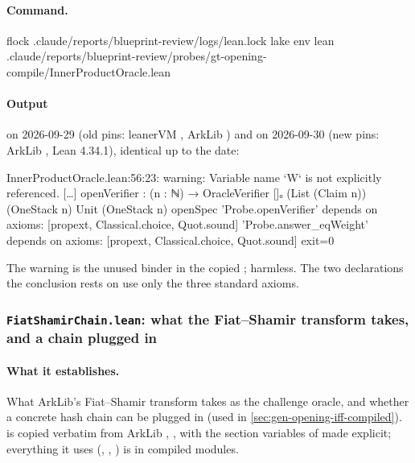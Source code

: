 \paragraph{Command.}
\begin{shellcode}
flock .claude/reports/blueprint-review/logs/lean.lock lake env lean .claude/reports/blueprint-review/probes/gt-opening-compile/InnerProductOracle.lean
\end{shellcode}

\paragraph{Output} on 2026-09-29 (old pins: leanerVM , ArkLib ) and on
2026-09-30 (new pins: ArkLib , Lean 4.34.1), identical up to the date:
\begin{shellcode}
InnerProductOracle.lean:56:23: warning: Variable name `W` is not explicitly referenced. […]
openVerifier : (n : ℕ) → OracleVerifier []ₒ (List (Claim n)) (OneStack n) Unit (OneStack n) openSpec
'Probe.openVerifier' depends on axioms: [propext, Classical.choice, Quot.sound]
'Probe.answer_eqWeight' depends on axioms: [propext, Classical.choice, Quot.sound]
exit=0
\end{shellcode}
The warning is the unused binder  in the copied ; harmless. The two
declarations the conclusion rests on use only the three standard axioms.

\subsubsection{\texttt{FiatShamirChain.lean}: what the Fiat--Shamir transform takes, and a chain plugged in}\label{sec:gen-opening-probe-fs}

\paragraph{What it establishes.} What ArkLib's Fiat--Shamir transform takes as the challenge oracle,
and whether a concrete hash chain can be plugged in (used in \cref{sec:gen-opening-iff-compiled}).
 is copied verbatim from ArkLib ,
, with the section variables of
 made explicit; everything it uses (,
, ) is in compiled modules.

